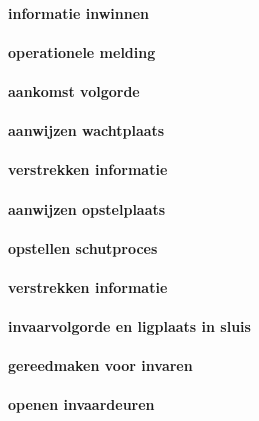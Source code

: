 \paragraph{informatie inwinnen}


\paragraph{operationele melding}


\paragraph{aankomst volgorde}

\paragraph{aanwijzen wachtplaats}


\paragraph{verstrekken informatie}


\paragraph{aanwijzen opstelplaats}

\paragraph{opstellen schutproces}


\paragraph{verstrekken informatie}


\paragraph{invaarvolgorde en ligplaats in sluis}

\paragraph{gereedmaken voor invaren}



\paragraph{openen invaardeuren}




